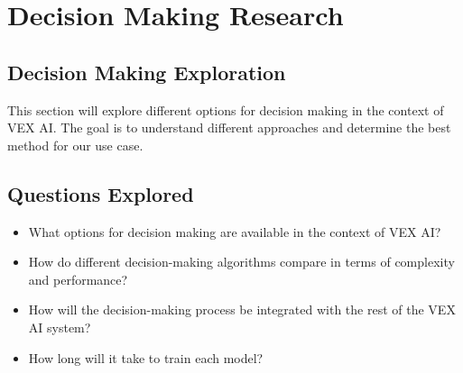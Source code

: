 \section*{Decision Making Research}

\subsection*{Decision Making Exploration}

This section will explore different options for decision making in the context of VEX AI.
The goal is to understand different approaches and determine the best method for our use case.


\subsection*{Questions Explored}
\begin{itemize}
    \item What options for decision making are available in the context of VEX AI?
    \item How do different decision-making algorithms compare in terms of complexity and performance?
    \item How will the decision-making process be integrated with the rest of the VEX AI system?
    \item How long will it take to train each model?
\end{itemize}

